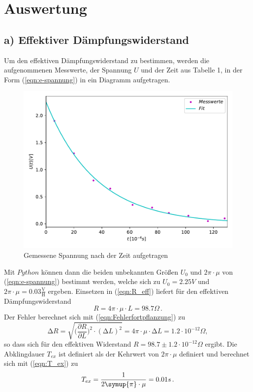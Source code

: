 \section{Auswertung}
\label{sec:Auswertung}
\subsection{a) Effektiver Dämpfungswiderstand}
        Um den effektiven Dämpfungswiderstand zu bestimmen, werden die aufgenommenen Messwerte, der Spannung $U$ und der Zeit aus Tabelle 1, in der Form (\ref{eqn:e-spannung}) in ein Diagramm aufgetragen.
        \begin{figure}[H]
          \centering
          \includegraphics{a.pdf}
          \caption{Gemessene Spannung nach der Zeit aufgetragen}
        \end{figure}
        Mit $Python$ können dann die beiden unbekannten Größen $U_0$ und $2 \pi \cdot \mu$ von (\ref{eqn:e-spannung}) bestimmt werden, welche sich zu $U_0 = 2.25 V$ und $2\pi \cdot \mu = 0.03 \frac{\mathrm{V}}{\mathrm{H}}$ ergeben. Einsetzen in (\ref{eqn:R_eff}) liefert für den effektiven Dämpfungswiderstand
        \begin{equation*}
          R = 4 \pi \cdot \mu \cdot L = 98.7 \Omega \, .
        \end{equation*}
        Der Fehler berechnet sich mit (\ref{eqn:Fehlerfortpflanzung}) zu 
        \begin{equation}
            \increment R = \sqrt{\biggl(\frac{\partial R}{\partial L}\biggr)^2 \cdot (\increment L)^2} = 4 \pi \cdot \mu \cdot \increment L = 1.2 \cdot 10^{-12} \Omega,
        \end{equation}
        so dass sich für den effektiven Widerstand $R= 98.7 \pm 1.2 \cdot 10^{-12} \Omega$ ergibt.
        Die Abklingdauer $T_{ex}$ ist definiert als der Kehrwert von $2 \pi \cdot \mu$ definiert und berechnet sich mit (\ref{eqn:T_ex}) zu
        \begin{equation*}
          T_{ex} = \frac{1}{2\symup{\pi}\cdot \mu} = 0.01 s \, .
        \end{equation*}
